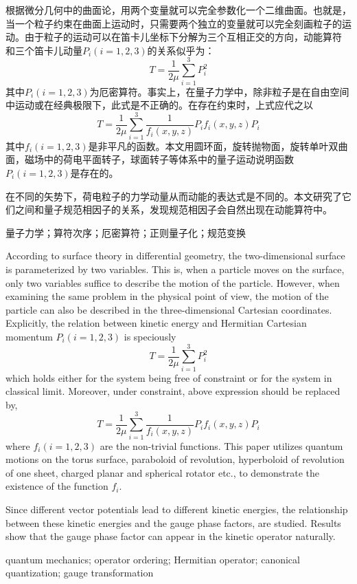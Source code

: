 \begin{abstractCN}
    根据微分几何中的曲面论，用两个变量就可以完全参数化一个二维曲面。也就是，当一个粒子约束在曲面上运动时，只需要两个独立的变量就可以完全刻画粒子的运动。由于粒子的运动可以在笛卡儿坐标下分解为三个互相正交的方向，动能算符 和三个笛卡儿动量$P_i(i=1,2,3)$的关系似乎为：
    \begin{equation*}
    	T=\frac{1}{2\mu}\sum_{i=1}^{3}P^2_i
    \end{equation*}
	其中$P_i(i=1,2,3)$为厄密算符。事实上，在量子力学中，除非粒子是在自由空间中运动或在经典极限下，此式是不正确的。在存在约束时，上式应代之以
	\begin{equation*}
		T=\frac{1}{2\mu}\sum_{i=1}^3\frac{1}{f_i(x,y,z)}P_if_i(x,y,z)P_i
	\end{equation*}
	其中$f_i(i=1,2,3)$是非平凡的函数。本文用圆环面，旋转抛物面，旋转单叶双曲面，磁场中的荷电平面转子，球面转子等体系中的量子运动说明函数$P_i(i=1,2,3)$是存在的。
	
	在不同的矢势下，荷电粒子的力学动量从而动能的表达式是不同的。本文研究了它们之间和量子规范相因子的关系，发现规范相因子会自然出现在动能算符中。

    \keywordsCN 量子力学；算符次序；厄密算符；正则量子化；规范变换
\end{abstractCN}

\begin{abstractENG}
	According to surface theory in differential geometry, the two-dimensional surface is parameterized by two variables. This is, when a particle moves on the surface, only two variables suffice to describe the motion of the particle. However, when examining the same problem in the physical point of view, the motion of the particle can also be described in the three-dimensional Cartesian coordinates. Explicitly, the relation between kinetic energy  and Hermitian Cartesian momentum $P_i(i=1,2,3)$ is speciously
    \begin{equation*}
		T=\frac{1}{2\mu}\sum_{i=1}^{3}P^2_i
	\end{equation*}
	which holds either for the system being free of constraint or for the system in classical limit. Moreover, under constraint, above expression should be replaced by,
	\begin{equation*}
		T=\frac{1}{2\mu}\sum_{i=1}^3\frac{1}{f_i(x,y,z)}P_if_i(x,y,z)P_i
	\end{equation*}
	where $f_i(i=1,2,3)$ are the non-trivial functions. This paper utilizes quantum motions on the torus surface, paraboloid of revolution, hyperboloid of revolution of one sheet, charged planar and spherical rotator etc., to demonstrate the existence of the function $f_i$.
	
	Since different vector potentials lead to different kinetic energies, the relationship between these kinetic energies and the gauge phase factors, are studied. Results show that the gauge phase factor can appear in the kinetic operator naturally. 



    \keywordsENG quantum mechanics;  operator ordering;  Hermitian operator;  canonical quantization; gauge transformation
\end{abstractENG}